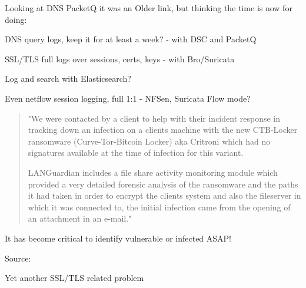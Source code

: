 \documentclass[20pt,landscape,a4paper,footrule]{foils}
\begin{document}

Looking at DNS PacketQ it was an Older link, but thinking the time is now for doing:

\begin{list2}
\item DNS query logs, keep it for at least a week? - with DSC and PacketQ
\item SSL/TLS full logs over sessions, certs, keys - with Bro/Suricata\\
\item Log and search with Elasticsearch?\\
\item Even netflow session logging, full 1:1 - NFSen, Suricata Flow mode?
\end{list2}



\begin{quote}
"We were contacted by a client to help with their incident response in tracking down an
infection on a clients machine with the new CTB-Locker ransomware (Curve-Tor-Bitcoin Locker)
aka Critroni which had no signatures available at the time of infection for this variant.

LANGuardian includes a file share activity monitoring module which provided a very
detailed forensic analysis of the ransomware and the paths it had taken in order to
encrypt the clients system and also the fileserver in which it was connected to, the
initial infection came from the opening of an attachment in an e-mail."
\end{quote}

\vskip 1cm

\centerline{It has become critical to identify vulnerable or infected ASAP!}

Source:
{\tiny{}}


\centerline{Yet another SSL/TLS related problem}

\end{document}
